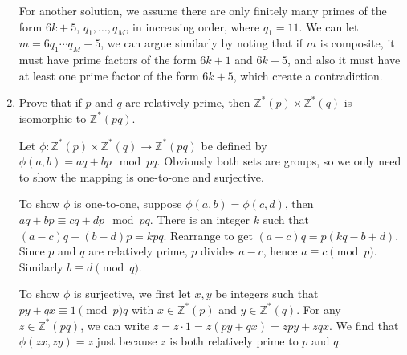 \documentclass{article}
\begin{document}
\begin{enumerate}
\begin{solution}
        For another solution, we assume there are only finitely many primes of the form $6k+5$, $q_1, \dots, q_M$, in increasing order,
        where $q_1=11$.
        We can let $m=6q_1\cdots q_M+5$, we can argue similarly by noting that if $m$ is composite, it must have prime factors of the form
        $6k+1$ and $6k+5$, and also it must have at least one prime factor of the form $6k+5$, which create a contradiction.
    \end{solution}

    \item Prove that if $p$ and $q$ are relatively prime, then $\mathbb Z^* (p) \times \mathbb Z^* (q)$ is isomorphic to $\mathbb Z^* (pq)$.
    
    \begin{solution}
        Let $\phi: \mathbb Z^* (p) \times \mathbb Z^* (q) \to \mathbb Z^* (pq)$ be defined by $\phi(a,b) = aq+bp \mod pq$.
        Obviously both sets are groups, so we only need to show the mapping is one-to-one and surjective.

        To show $\phi$ is one-to-one, suppose $\phi(a,b) = \phi(c,d)$, then $aq+bp \equiv cq+dp \mod pq$. There is an integer $k$ such that
        $(a-c)q+(b-d)p = kpq.$ Rearrange to get $(a-c)q = p(kq-b+d)$. Since $p$ and $q$ are relatively prime, $p$ divides $a-c$, hence $a\equiv c\pmod p$.
        Similarly $b\equiv d\pmod q$.

        To show $\phi$ is surjective, we first let $x,y$ be integers such that $py+qx\equiv 1\pmod pq$ with $x\in\mathbb Z^*(p)$ and $y\in\mathbb Z^*(q)$.
        For any $z\in\mathbb Z^*(pq)$, we can write $z = z\cdot 1 = z(py+qx) = zpy+zqx$. We find that $\phi(zx, zy) = z$ just because $z$ is
        both relatively prime to $p$ and $q$. 
    \end{solution}
\end{enumerate}
\end{document}
